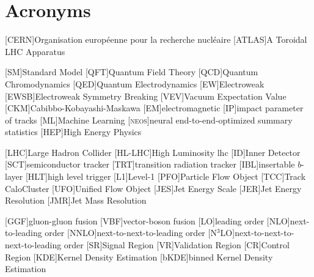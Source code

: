 
\chapter{Acronyms}
\begin{acronym}[neos]
    [CERN]{Organisation européenne pour la recherche nucléaire}
    [ATLAS]{A Toroidal LHC Apparatus}

    [SM]{Standard Model}
    [QFT]{Quantum Field Theory}
    [QCD]{Quantum Chromodynamics}
    [QED]{Quantum Electrodynamics}
    [EW]{Electroweak}
    [EWSB]{Electroweak Symmetry Breaking}
    [VEV]{Vacuum Expectation Value}
    [CKM]{Cabibbo-Kobayashi-Maskawa}
    [EM]{electromagnetic}
    [IP]{impact parameter of tracks}
    [ML]{Machine Learning}
    [\textsc{neos}]{neural end-to-end-optimized summary statistics}
    [HEP]{High Energy Physics}



    [LHC]{Large Hadron Collider}
    [HL-LHC]{High Luminosity \acs{lhc}}
    [ID]{Inner Detector}
    [SCT]{semiconductor tracker}
    [TRT]{transition radiation tracker}
    [IBL]{insertable $b$-layer}
    [HLT]{high level trigger}
    [L1]{Level-1}
    [PFO]{Particle Flow Object}
    [TCC]{Track CaloCluster}
    [UFO]{Unified Flow Object}
    [JES]{Jet Energy Scale}
    [JER]{Jet Energy Resolution}
    [JMR]{Jet Mass Resolution}


    [GGF]{gluon-gluon fusion}
    [VBF]{vector-boson fusion}
    [LO]{leading order}
    [NLO]{next-to-leading order}
    [NNLO]{next-to-next-to-leading order}
    [N$^3$LO]{next-to-next-to-next-to-leading order}
    [SR]{Signal Region}
    [VR]{Validation Region}
    [CR]{Control Region}
    [KDE]{Kernel Density Estimation}
    [bKDE]{binned Kernel Density Estimation}


\end{acronym}
